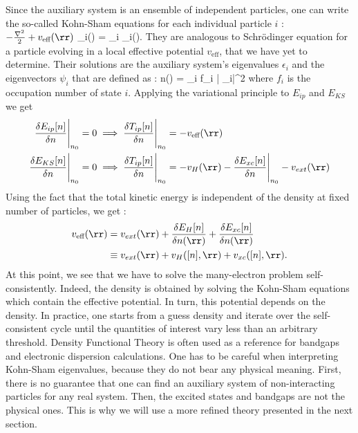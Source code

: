 Since the auxiliary system is an ensemble of independent particles, one can write the so-called Kohn-Sham equations for each individual particle $i$ :
\be
 	\( -\frac{\nabla^2}{2} + v_{\text{eff}}(\rr)\) \psi_i(\rr) = \epsilon_i \psi_i(\rr).
\ee
They are analogous to Schrödinger equation for a particle evolving in a local effective potential $v_{\text{eff}}$, that we have yet to determine. Their solutions are the auxiliary system's eigenvalues $\epsilon_i$ and the eigenvectors $\psi_i$ that are defined as :
\be
 	n(\rr) = \sum_i f_i \left| \psi_i\right|^2 \label{eq:DFT_n_vs_psi}
\ee
where $f_i$ is the occupation number of state $i$. 
Applying the variational principle to $E_{ip}$ and $E_{KS}$ we get 
\begin{align}
    \frac{\delta E_{ip}[n]}{\delta n} \Biggr|_{n_0} = 0 &\implies \frac{\delta T_{ip}[n]}{\delta n} \Biggr|_{n_0} = - v_{\text{eff}}(\rr) \\
    \frac{\delta E_{KS}[n]}{\delta n} \Biggr|_{n_0} = 0 &\implies \frac{\delta T_{ip}[n]}{\delta n} \Biggr|_{n_0} = - v_H(\rr) - \frac{\delta E_{xc}[n]}{\delta n} \Biggr|_{n_0} - v_{ext}(\rr)
\end{align}
Using the fact that the total kinetic energy is independent of the density at fixed number of particles, we get :
\begin{align}
\begin{split}
	v_{\text{eff}}(\rr) &= v_{ext}(\rr) + \frac{\delta E_H[n]}{\delta n(\rr)} + \frac{\delta E_{xc}[n]}{\delta n(\rr)} \\
	&\equiv v_{ext}(\rr) + v_H([n],\rr) + v_{xc}([n],\rr).
\end{split}
\end{align}
At this point, we see that we have to solve the many-electron problem self-consistently. Indeed, the density is obtained by solving the Kohn-Sham equations which contain the effective potential. In turn, this potential depends on the density. In practice, one starts from a guess density and iterate over the self-consistent cycle until the quantities of interest vary less than an arbitrary threshold.
Density Functional Theory is often used as a reference for bandgaps and electronic dispersion calculations. One has to be careful when interpreting Kohn-Sham eigenvalues, because they do not bear any physical meaning. First, there is no guarantee that one can find an auxiliary system of non-interacting particles for any real system. Then, the excited states and bandgaps are not the physical ones. This is why we will use a more refined theory presented in the next section.

